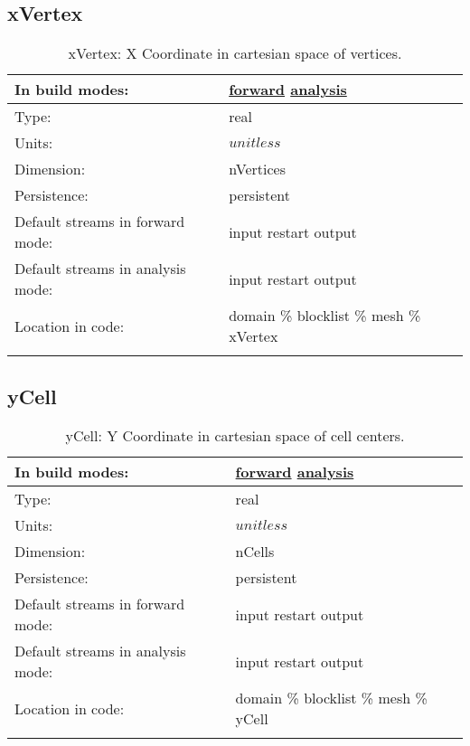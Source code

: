 \subsection[xVertex]{xVertex}
\label{subsec:var_sec_mesh_xVertex}
\begin{center}
\begin{longtable}{| p{2.0in} | p{4.0in} |}
        \hline 
        In build modes: & \hyperref[subsec:forward_var_tab_mesh]{forward} \hyperref[subsec:analysis_var_tab_mesh]{analysis} \\
        \hline 
        Type: & real \\
        \hline 
        Units: & $unitless$ \\
        \hline 
        Dimension: & nVertices \\
        \hline 
        Persistence: & persistent \\
        \hline 
		 Default streams in forward mode: &  input restart output \\
        \hline 
		 Default streams in analysis mode: &  input restart output \\
        \hline 
		 Location in code: & domain \% blocklist \% mesh \% xVertex \\
		 \hline 
    \caption{xVertex: X Coordinate in cartesian space of vertices.}
\end{longtable}
\end{center}
\subsection[yCell]{yCell}
\label{subsec:var_sec_mesh_yCell}
\begin{center}
\begin{longtable}{| p{2.0in} | p{4.0in} |}
        \hline 
        In build modes: & \hyperref[subsec:forward_var_tab_mesh]{forward} \hyperref[subsec:analysis_var_tab_mesh]{analysis} \\
        \hline 
        Type: & real \\
        \hline 
        Units: & $unitless$ \\
        \hline 
        Dimension: & nCells \\
        \hline 
        Persistence: & persistent \\
        \hline 
		 Default streams in forward mode: &  input restart output \\
        \hline 
		 Default streams in analysis mode: &  input restart output \\
        \hline 
		 Location in code: & domain \% blocklist \% mesh \% yCell \\
		 \hline 
    \caption{yCell: Y Coordinate in cartesian space of cell centers.}
\end{longtable}
\end{center}
